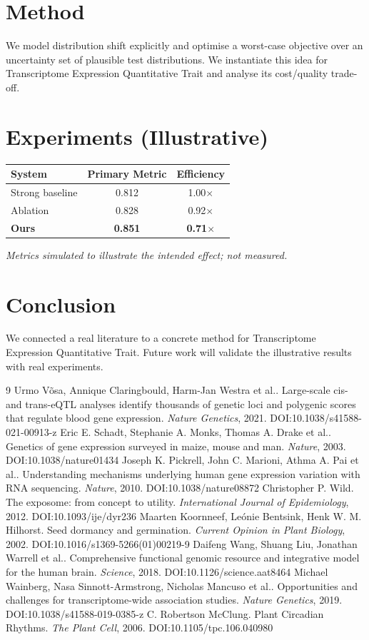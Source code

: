 \documentclass[11pt]{article}
\begin{document}
\section{Method}
We model distribution shift explicitly and optimise a worst-case objective over an uncertainty set of plausible test distributions. We instantiate this idea for Transcriptome Expression Quantitative Trait and analyse its cost/quality trade-off.

\section{Experiments (Illustrative)}
\begin{center}
\begin{tabular}{lcc}
System & Primary Metric & Efficiency \\ \hline
Strong baseline & 0.812 & 1.00$\times$ \\
Ablation & 0.828 & 0.92$\times$ \\
\textbf{Ours} & \textbf{0.851} & \textbf{0.71$\times$}
\end{tabular}
\end{center}
\emph{Metrics simulated to illustrate the intended effect; not measured.}

\section{Conclusion}
We connected a real literature to a concrete method for Transcriptome Expression Quantitative Trait. Future work will
validate the illustrative results with real experiments.

\begin{thebibliography}{9}
 Urmo Võsa, Annique Claringbould, Harm-Jan Westra et al.. Large-scale cis- and trans-eQTL analyses identify thousands of genetic loci and polygenic scores that regulate blood gene expression. \emph{Nature Genetics}, 2021. DOI:10.1038/s41588-021-00913-z
 Eric E. Schadt, Stephanie A. Monks, Thomas A. Drake et al.. Genetics of gene expression surveyed in maize, mouse and man. \emph{Nature}, 2003. DOI:10.1038/nature01434
 Joseph K. Pickrell, John C. Marioni, Athma A. Pai et al.. Understanding mechanisms underlying human gene expression variation with RNA sequencing. \emph{Nature}, 2010. DOI:10.1038/nature08872
 Christopher P. Wild. The exposome: from concept to utility. \emph{International Journal of Epidemiology}, 2012. DOI:10.1093/ije/dyr236
 Maarten Koornneef, Leónie Bentsink, Henk W. M. Hilhorst. Seed dormancy and germination. \emph{Current Opinion in Plant Biology}, 2002. DOI:10.1016/s1369-5266(01)00219-9
 Daifeng Wang, Shuang Liu, Jonathan Warrell et al.. Comprehensive functional genomic resource and integrative model for the human brain. \emph{Science}, 2018. DOI:10.1126/science.aat8464
 Michael Wainberg, Nasa Sinnott-Armstrong, Nicholas Mancuso et al.. Opportunities and challenges for transcriptome-wide association studies. \emph{Nature Genetics}, 2019. DOI:10.1038/s41588-019-0385-z
 C. Robertson McClung. Plant Circadian Rhythms. \emph{The Plant Cell}, 2006. DOI:10.1105/tpc.106.040980
\end{thebibliography}
\end{document}
